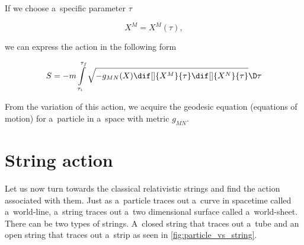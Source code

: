 \noindent
If we choose a~specific parameter $\tau$

\begin{equation*}
X^{M} = X^{M}(\tau),
\end{equation*}

\noindent
we can express the action in the following form

\begin{equation}
    S = -m \int\limits_{\tau_i}^{\tau_f} \sqrt{-g_{MN}(X) \dif[] {X^{M}} {\tau} \dif[]{X^{N}}{\tau}} \D \tau
\end{equation}

\noindent
From the variation of this action, we acquire the geodesic equation (equations of motion) for a~particle in a~space with metric $g_{MN}$.


\section{String action}
\label{sec:string_action}

Let us now turn towards the classical relativistic strings and find the action associated with them. Just as a~particle traces out a~curve in spacetime called a~world-line, a~string traces out a~two dimensional surface called a~world-sheet. There can be two types of strings. A~closed string that traces out a~tube and an open string that traces out a~strip as seen in \cref{fig:particle_vs_string}. 

